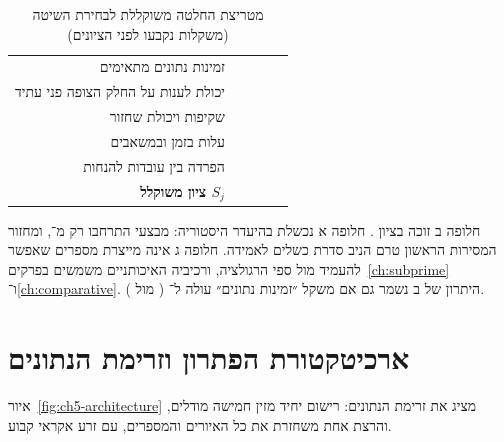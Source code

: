 \begin{table}[!htb]
\centering
\caption[מטריצת החלטה לבחירת השיטה]{מטריצת החלטה משוקללת לבחירת השיטה (משקלות נקבעו לפני הציונים)}
\label{tab:ch5-matrix}
\small
\begin{tabularx}{\tabmaxwidth}{R >{\centering\arraybackslash}p{1.2cm} >{\centering\arraybackslash}p{1.5cm} >{\centering\arraybackslash}p{1.5cm} >{\centering\arraybackslash}p{1.5cm}}
\toprule
{} &  &  &  &  \\
\midrule
זמינות נתונים מתאימים &  &  &  &  \\
יכולת לענות על החלק הצופה פני עתיד &  &  &  &  \\
שקיפות ויכולת שחזור &  &  &  &  \\
עלות בזמן ובמשאבים &  &  &  &  \\
הפרדה בין עובדות להנחות &  &  &  &  \\
\midrule
\textbf{ציון משוקלל $S_j$} &  & \textbf{} & \textbf{} & \textbf{} \\
\bottomrule
\end{tabularx}
\end{table}

חלופה ב זוכה בציון . חלופה א נכשלת בהיעדר היסטוריה: מבצעי  התרחבו רק מ־, ומחזור המסירות הראשון טרם הניב סדרת כשלים לאמידה. חלופה ג אינה מייצרת מספרים שאפשר להעמיד מול ספי הרגולציה, ורכיביה האיכותניים משמשים בפרקים~\ref{ch:subprime} ו־\ref{ch:comparative}. היתרון של ב נשמר גם אם משקל ״זמינות נתונים״ עולה ל־ ( מול ).

\section{ארכיטקטורת הפתרון וזרימת הנתונים}
\label{sec:ch5-architecture}

איור~\ref{fig:ch5-architecture} מציג את זרימת הנתונים: רישום יחיד מזין חמישה מודלים, והרצת  אחת משחזרת את כל האיורים והמספרים, עם זרע אקראי קבוע.


